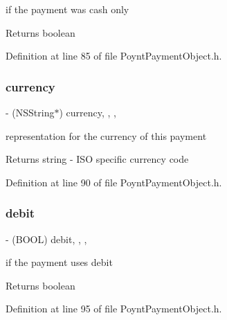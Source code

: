 if the payment was cash only 

\begin{DoxyReturn}{Returns}
boolean 
\end{DoxyReturn}


Definition at line 85 of file Poynt\+Payment\+Object.\+h.

\hypertarget{interface_poynt_payment_object_a71a9104f71558df8791cedc5e81941a3}{}\label{interface_poynt_payment_object_a71a9104f71558df8791cedc5e81941a3} 
\subsubsection{\texorpdfstring{currency}{currency}}
{\footnotesize\ttfamily -\/ (N\+S\+String$\ast$) currency\hspace{0.3cm}{\ttfamily [read]}, {\ttfamily [write]}, {\ttfamily [nonatomic]}, {\ttfamily [copy]}}



representation for the currency of this payment 

\begin{DoxyReturn}{Returns}
string -\/ I\+SO specific currency code 
\end{DoxyReturn}


Definition at line 90 of file Poynt\+Payment\+Object.\+h.

\hypertarget{interface_poynt_payment_object_a76dfb16e254da2dd51a3269700a40581}{}\label{interface_poynt_payment_object_a76dfb16e254da2dd51a3269700a40581} 
\subsubsection{\texorpdfstring{debit}{debit}}
{\footnotesize\ttfamily -\/ (B\+O\+OL) debit\hspace{0.3cm}{\ttfamily [read]}, {\ttfamily [write]}, {\ttfamily [nonatomic]}, {\ttfamily [assign]}}



if the payment uses debit 

\begin{DoxyReturn}{Returns}
boolean 
\end{DoxyReturn}


Definition at line 95 of file Poynt\+Payment\+Object.\+h.

